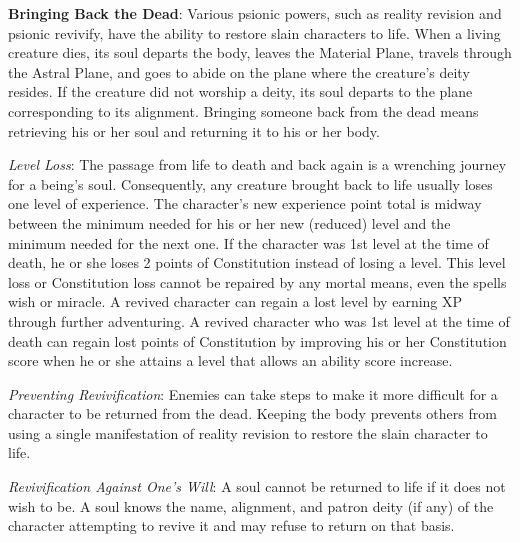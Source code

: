 \textbf{Bringing Back the Dead}: Various psionic powers, such as reality revision and psionic revivify, have the ability to restore slain characters to life. When a living creature dies, its soul departs the body, leaves the Material Plane, travels through the Astral Plane, and goes to abide on the plane where the creature's deity resides. If the creature did not worship a deity, its soul departs to the plane corresponding to its alignment. Bringing someone back from the dead means retrieving his or her soul and returning it to his or her body.

\textit{Level Loss}: The passage from life to death and back again is a wrenching journey for a being's soul. Consequently, any creature brought back to life usually loses one level of experience. The character's new experience point total is midway between the minimum needed for his or her new (reduced) level and the minimum needed for the next one. If the character was 1st level at the time of death, he or she loses 2 points of Constitution instead of losing a level. This level loss or Constitution loss cannot be repaired by any mortal means, even the spells wish or miracle. A revived character can regain a lost level by earning XP through further adventuring. A revived character who was 1st level at the time of death can regain lost points of Constitution by improving his or her Constitution score when he or she attains a level that allows an ability score increase.

\textit{Preventing Revivification}: Enemies can take steps to make it more difficult for a character to be returned from the dead. Keeping the body prevents others from using a single manifestation of reality revision to restore the slain character to life.

\textit{Revivification Against One's Will}: A soul cannot be returned to life if it does not wish to be. A soul knows the name, alignment, and patron deity (if any) of the character attempting to revive it and may refuse to return on that basis.